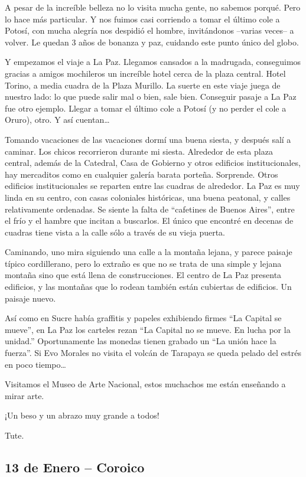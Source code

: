 A pesar de la increíble belleza no lo visita mucha gente, no sabemos porqué.
Pero lo hace más particular. Y nos fuimos casi corriendo a tomar el último
cole a Potosí, con mucha alegría nos despidió el hombre, invitándonos
--varias veces-- a volver. Le quedan 3 años de bonanza y paz, cuidando este
punto único del globo.

Y empezamos el viaje a La Paz. Llegamos cansados a la madrugada, conseguimos
gracias a amigos mochileros un increíble hotel cerca de la plaza central. Hotel
Torino, a media cuadra de la Plaza Murillo. La suerte en este viaje juega de
nuestro lado: lo que puede salir mal o bien, sale bien. Conseguir pasaje a La
Paz fue otro ejemplo. Llegar a tomar el último cole a Potosí (y no perder el
cole a Oruro), otro. Y así cuentan\ldots

Tomando vacaciones de las vacaciones dormí una buena siesta, y después salí a
caminar. Los chicos recorrieron durante mi siesta. Alrededor de esta plaza
central, además de la Catedral, Casa de Gobierno y otros edificios
institucionales, hay mercaditos como en cualquier galería barata porteña.
Sorprende. Otros edificios institucionales se reparten entre las cuadras de
alrededor. La Paz es muy linda en su centro, con casas coloniales históricas,
una buena peatonal, y calles relativamente ordenadas. Se siente la falta de
``cafetines de Buenos Aires'', entre el frío y el hambre que incitan a
buscarlos. El único que encontré en decenas de cuadras tiene vista a la calle
sólo a través de su vieja puerta.

Caminando, uno mira siguiendo una calle a la montaña lejana, y parece paisaje
típico cordillerano, pero lo extraño es que no se trata de una simple y
lejana montaña sino que está llena de construcciones. El centro de La Paz
presenta edificios, y las montañas que lo rodean también están cubiertas de
edificios. Un paisaje nuevo.

Así como en Sucre había graffitis y papeles exhibiendo firmes ``La Capital se
mueve'', en La Paz los carteles rezan ``La Capital no se mueve. En lucha por la
unidad.'' Oportunamente las monedas tienen grabado un ``La unión hace la
fuerza''. Si Evo Morales no visita el volcán de Tarapaya se queda pelado del
estrés en poco tiempo\ldots

Visitamos el Museo de Arte Nacional, estos muchachos me están enseñando a
mirar arte.

¡Un beso y un abrazo muy grande a todos!

Tute.

\subsection*{13 de Enero -- Coroico}

